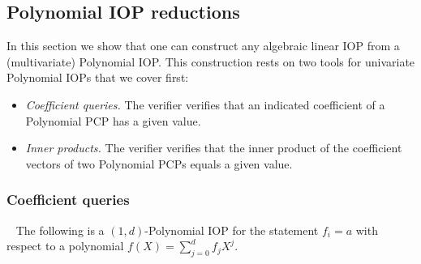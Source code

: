 \subsection{Polynomial IOP reductions} 

In this section we show that one can construct any algebraic linear IOP from a (multivariate) Polynomial IOP. This construction rests on two tools for univariate Polynomial IOPs that we cover first:
\begin{itemize}
    \item \emph{Coefficient queries.} The verifier verifies that an indicated coefficient of a Polynomial PCP has a given value.
    \item \emph{Inner products.} The verifier verifies that the inner product of the coefficient vectors of two Polynomial PCPs equals a given value.
\end{itemize}

\subsubsection{Coefficient queries}~\label{sec:opencoefficient} 
The following is a $(1, d)$-Polynomial IOP for the statement $f_i = a$ with respect to a polynomial $f(X) = \sum_{j=0}^d f_j X^j$. %

